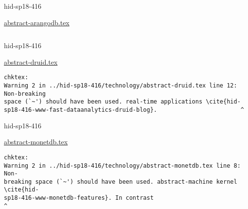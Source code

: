 

\begin{IU}

hid-sp18-416

\href{https://github.com/cloudmesh-community/hid-sp18-416/blob/master//technology/abstract-arangodb.tex}{abstract-arangodb.tex}

\begin{tiny}
\begin{verbatim}
\end{verbatim}
\end{tiny}
\end{IU}



\begin{IU}

hid-sp18-416

\href{https://github.com/cloudmesh-community/hid-sp18-416/blob/master//technology/abstract-druid.tex}{abstract-druid.tex}

\begin{tiny}
\begin{verbatim}
chktex:
Warning 2 in ../hid-sp18-416/technology/abstract-druid.tex line 12: Non-breaking
space (`~') should have been used. real-time applications \cite{hid-
sp18-416-www-fast-dataanalytics-druid-blog}.                        ^
\end{verbatim}
\end{tiny}
\end{IU}



\begin{IU}

hid-sp18-416

\href{https://github.com/cloudmesh-community/hid-sp18-416/blob/master//technology/abstract-monetdb.tex}{abstract-monetdb.tex}

\begin{tiny}
\begin{verbatim}
chktex:
Warning 2 in ../hid-sp18-416/technology/abstract-monetdb.tex line 8: Non-
breaking space (`~') should have been used. abstract-machine kernel \cite{hid-
sp18-416-www-monetdb-features}. In contrast                           ^
\end{verbatim}
\end{tiny}
\end{IU}




